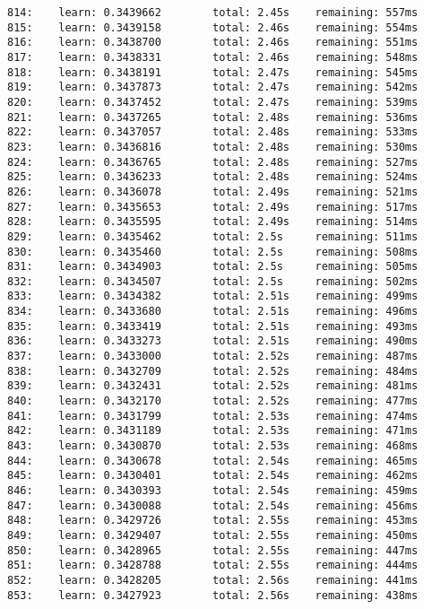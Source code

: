 \documentclass[11pt]{article}
\begin{document}
\begin{Verbatim}[commandchars=\\\{\}]
814:    learn: 0.3439662        total: 2.45s    remaining: 557ms
815:    learn: 0.3439158        total: 2.46s    remaining: 554ms
816:    learn: 0.3438700        total: 2.46s    remaining: 551ms
817:    learn: 0.3438331        total: 2.46s    remaining: 548ms
818:    learn: 0.3438191        total: 2.47s    remaining: 545ms
819:    learn: 0.3437873        total: 2.47s    remaining: 542ms
820:    learn: 0.3437452        total: 2.47s    remaining: 539ms
821:    learn: 0.3437265        total: 2.48s    remaining: 536ms
822:    learn: 0.3437057        total: 2.48s    remaining: 533ms
823:    learn: 0.3436816        total: 2.48s    remaining: 530ms
824:    learn: 0.3436765        total: 2.48s    remaining: 527ms
825:    learn: 0.3436233        total: 2.48s    remaining: 524ms
826:    learn: 0.3436078        total: 2.49s    remaining: 521ms
827:    learn: 0.3435653        total: 2.49s    remaining: 517ms
828:    learn: 0.3435595        total: 2.49s    remaining: 514ms
829:    learn: 0.3435462        total: 2.5s     remaining: 511ms
830:    learn: 0.3435460        total: 2.5s     remaining: 508ms
831:    learn: 0.3434903        total: 2.5s     remaining: 505ms
832:    learn: 0.3434507        total: 2.5s     remaining: 502ms
833:    learn: 0.3434382        total: 2.51s    remaining: 499ms
834:    learn: 0.3433680        total: 2.51s    remaining: 496ms
835:    learn: 0.3433419        total: 2.51s    remaining: 493ms
836:    learn: 0.3433273        total: 2.51s    remaining: 490ms
837:    learn: 0.3433000        total: 2.52s    remaining: 487ms
838:    learn: 0.3432709        total: 2.52s    remaining: 484ms
839:    learn: 0.3432431        total: 2.52s    remaining: 481ms
840:    learn: 0.3432170        total: 2.52s    remaining: 477ms
841:    learn: 0.3431799        total: 2.53s    remaining: 474ms
842:    learn: 0.3431189        total: 2.53s    remaining: 471ms
843:    learn: 0.3430870        total: 2.53s    remaining: 468ms
844:    learn: 0.3430678        total: 2.54s    remaining: 465ms
845:    learn: 0.3430401        total: 2.54s    remaining: 462ms
846:    learn: 0.3430393        total: 2.54s    remaining: 459ms
847:    learn: 0.3430088        total: 2.54s    remaining: 456ms
848:    learn: 0.3429726        total: 2.55s    remaining: 453ms
849:    learn: 0.3429407        total: 2.55s    remaining: 450ms
850:    learn: 0.3428965        total: 2.55s    remaining: 447ms
851:    learn: 0.3428788        total: 2.55s    remaining: 444ms
852:    learn: 0.3428205        total: 2.56s    remaining: 441ms
853:    learn: 0.3427923        total: 2.56s    remaining: 438ms

\end{Verbatim}
\end{document}
